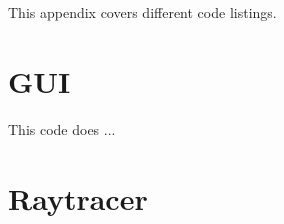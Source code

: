 


This appendix covers different code listings.

\section{GUI}

This code does ...

\section{Raytracer}

